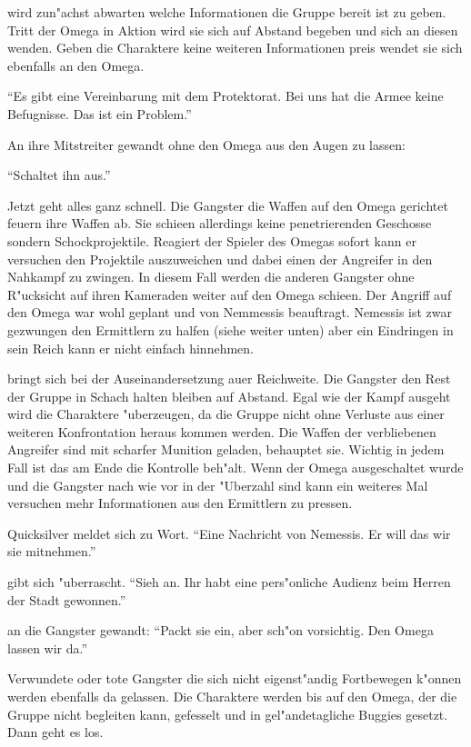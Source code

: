 \xlsn{} wird zun"achst abwarten welche Informationen die Gruppe bereit ist zu geben. Tritt der Omega in Aktion wird sie sich auf Abstand begeben und sich an diesen wenden. Geben die Charaktere keine weiteren Informationen preis wendet sie sich ebenfalls an den Omega.

"`Es gibt eine Vereinbarung mit dem Protektorat. Bei uns hat die Armee keine Befugnisse. Das ist ein Problem."' 

An ihre Mitstreiter gewandt ohne den Omega aus den Augen zu lassen:

"`Schaltet ihn aus."'

Jetzt geht alles ganz schnell. Die Gangster die Waffen auf den Omega gerichtet feuern ihre Waffen ab. Sie schie\3en allerdings keine penetrierenden Geschosse sondern Schockprojektile. Reagiert der Spieler des Omegas sofort kann er versuchen den Projektile auszuweichen und dabei einen der Angreifer in den Nahkampf zu zwingen. In diesem Fall werden die anderen Gangster ohne R"ucksicht auf ihren Kameraden weiter auf den Omega schie\3en. Der Angriff auf den Omega war wohl geplant und von Nemmessis beauftragt. Nemessis ist zwar gezwungen den Ermittlern zu halfen (siehe weiter unten) aber ein Eindringen in sein Reich kann er nicht einfach hinnehmen. 

\xlsn{} bringt sich bei der Auseinandersetzung au\3er Reichweite. Die Gangster den Rest der Gruppe in Schach halten bleiben auf Abstand. Egal wie der Kampf ausgeht wird \xlsn{} die Charaktere "uberzeugen, da\3 die Gruppe nicht ohne Verluste aus einer weiteren Konfrontation heraus kommen werden. Die Waffen der verbliebenen Angreifer sind mit scharfer Munition geladen, behauptet sie. Wichtig in jedem Fall ist das \xlsn{} am Ende die Kontrolle beh"alt. Wenn der Omega ausgeschaltet wurde und die Gangster nach wie vor in der "Uberzahl sind kann \xlsn{} ein weiteres Mal versuchen mehr Informationen aus den Ermittlern zu pressen.

Quicksilver meldet sich zu Wort. "`Eine Nachricht von Nemessis. Er will das wir sie mitnehmen."'

\xlsn{} gibt sich "uberrascht. "`Sieh an. Ihr habt eine pers"onliche Audienz beim Herren der Stadt gewonnen."'

\xlsn{} an die Gangster gewandt: "`Packt sie ein, aber sch"on vorsichtig. Den Omega lassen wir da."'

Verwundete oder tote Gangster die sich nicht eigenst"andig Fortbewegen k"onnen werden ebenfalls da gelassen. Die Charaktere werden bis auf den Omega, der die Gruppe nicht begleiten kann, gefesselt und in gel"andetagliche Buggies gesetzt. Dann geht es los.

